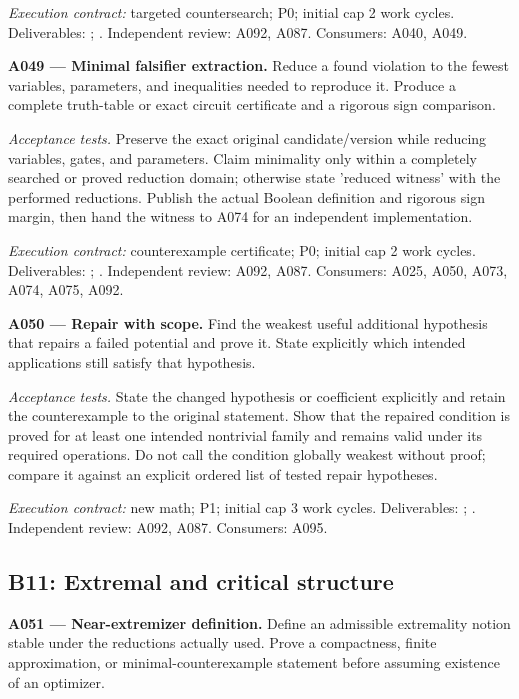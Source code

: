 \documentclass[11pt]{article}
\begin{document}
{\small\emph{Execution contract:} targeted countersearch; P0; initial cap 2 work cycles. Deliverables: ; . Independent review: A092, A087. Consumers: A040, A049.}

\textbf{A049 --- Minimal falsifier extraction.} Reduce a found violation to the fewest variables, parameters, and inequalities needed to reproduce it. Produce a complete truth-table or exact circuit certificate and a rigorous sign comparison.

\emph{Acceptance tests.} Preserve the exact original candidate/version while reducing variables, gates, and parameters. Claim minimality only within a completely searched or proved reduction domain; otherwise state 'reduced witness' with the performed reductions. Publish the actual Boolean definition and rigorous sign margin, then hand the witness to A074 for an independent implementation.

{\small\emph{Execution contract:} counterexample certificate; P0; initial cap 2 work cycles. Deliverables: ; . Independent review: A092, A087. Consumers: A025, A050, A073, A074, A075, A092.}

\textbf{A050 --- Repair with scope.} Find the weakest useful additional hypothesis that repairs a failed potential and prove it. State explicitly which intended applications still satisfy that hypothesis.

\emph{Acceptance tests.} State the changed hypothesis or coefficient explicitly and retain the counterexample to the original statement. Show that the repaired condition is proved for at least one intended nontrivial family and remains valid under its required operations. Do not call the condition globally weakest without proof; compare it against an explicit ordered list of tested repair hypotheses.

{\small\emph{Execution contract:} new math; P1; initial cap 3 work cycles. Deliverables: ; . Independent review: A092, A087. Consumers: A095.}

\subsection{B11: Extremal and critical structure}

\textbf{A051 --- Near-extremizer definition.} Define an admissible extremality notion stable under the reductions actually used. Prove a compactness, finite approximation, or minimal-counterexample statement before assuming existence of an optimizer.
\end{document}
